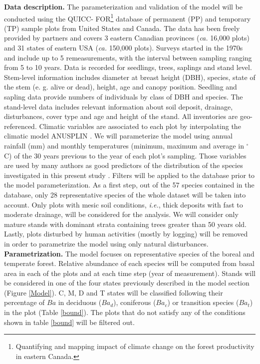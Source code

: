 \textbf{Data description.} The parameterization and validation of the model
will be conducted using the QUICC- FOR\footnote{Quantifying and mapping impact
of climate change on the forest productivity in eastern Canada.} database of
permanent (PP) and temporary (TP) sample plots from United States and Canada.
The data has been freely provided by partners and covers 3 eastern Canadian
provinces (\textit{ca.} 16,000 plots) and 31 states of eastern USA
(\textit{ca.} 150,000 plots). Surveys started in the 1970s and include up to 5
remeasurements, with the interval between sampling ranging from 5 to 10 years.
Data is recorded for seedlings, trees, saplings and stand level. Stem-level
information includes diameter at breast height (DBH), species, state of the
stem (e. g. alive or dead), height, age and canopy position. Seedling and
sapling data provide numbers of individuals by class of DBH and species. The
stand-level data includes relevant information about soil deposit, drainage,
disturbances, cover type and age and height of the stand. All  inventories are
geo-referenced. Climatic variables are associated to each plot by
interpolating  the climatic model ANUSPLIN \cite{McKenney2011} . We will
parameterize the model using annual rainfall (mm) and monthly temperatures
(minimum, maximum and average in \ensuremath{^\circ}C) of the 30 years
previous to the year of each plot's sampling. Those variables are used by many
authors as good predictors of the distribution of the species investigated in
this present study \cite{Goldblum2010}. Filters will be applied to the
database prior to the model parameterization. As a first step, out of the 57
species contained in the database, only 28 representative species of the whole
dataset will be taken into account. Only plots with mesic soil conditions,
\textit{i.e.}, thick deposits with fast to moderate drainage, will be
considered for the analysis. We will consider only mature stands with dominant
strata containing trees greater than 50 years old. Lastly, plots disturbed by
human activities (mostly by logging) will be removed in order to parametrize
the model using only natural disturbances. \\

\textbf{Parametrization.} The model focuses on representative species of the
boreal and temperate forest. Relative  abundance of each species will be
computed from basal area in each of the plots and at each time step (year of
measurement). Stands will be considered in one of the four states previously
described in the model section (Figure \ref{Model}). C, M, D and T states will
be classified following their percentage of $Ba$ in deciduous ($Ba_d$),
coniferous ($Ba_c$) or transition species ($Ba_t$) in the plot (Table
\ref{bound}). The plots that do not satisfy any of the conditions shown in
table \ref{bound} will be filtered out.\\

